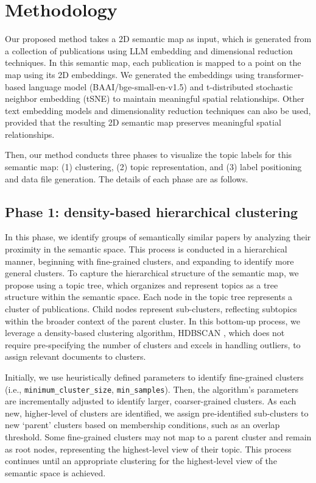 \documentclass{vgtc}                          %
\begin{document}
\section{Methodology}

Our proposed method takes a 2D semantic map as input, which is generated from a collection of publications using LLM embedding and dimensional reduction techniques. In this semantic map, each publication is mapped to a point on the map using its 2D embeddings. We generated the embeddings using transformer-based language model \cite{BAAI2023} (BAAI/bge-small-en-v1.5) and t-distributed stochastic neighbor embedding (tSNE) to maintain meaningful spatial relationships. Other text embedding models and dimensionality reduction techniques can also be used, provided that the resulting 2D semantic map preserves meaningful spatial relationships.

Then, our method conducts three phases to visualize the topic labels for this semantic map: (1) clustering, (2) topic representation, and (3) label positioning and data file generation. The details of each phase are as follows.

\subsection{Phase 1: density-based hierarchical clustering}

In this phase, we identify groups of semantically similar papers by analyzing their proximity in the semantic space. This process is conducted in a hierarchical manner, beginning with fine-grained clusters, and expanding to identify more general clusters. To capture the hierarchical structure of the semantic map, we propose using a topic tree, which organizes and represent topics as a tree structure within the semantic space. Each node in the topic tree represents a cluster of publications. Child nodes represent sub-clusters, reflecting subtopics within the broader context of the parent cluster. In this bottom-up process, we leverage a density-based clustering algorithm, HDBSCAN \cite{McInnes2017}, which does not require pre-specifying the number of clusters and excels in handling outliers, to assign relevant documents to clusters.

Initially, we use heuristically defined parameters to identify fine-grained clusters (i.e., \texttt{minimum\_cluster\_size}, \texttt{min\_samples}). Then, the algorithm's parameters are incrementally adjusted to identify larger, coarser-grained clusters. As each new, higher-level of clusters are identified, we assign pre-identified sub-clusters to new `parent' clusters based on membership conditions, such as an overlap threshold. Some fine-grained clusters may not map to a parent cluster and remain as root nodes, representing the highest-level view of their topic. This process continues until an appropriate clustering for the highest-level view of the semantic space is achieved.
\end{document}
